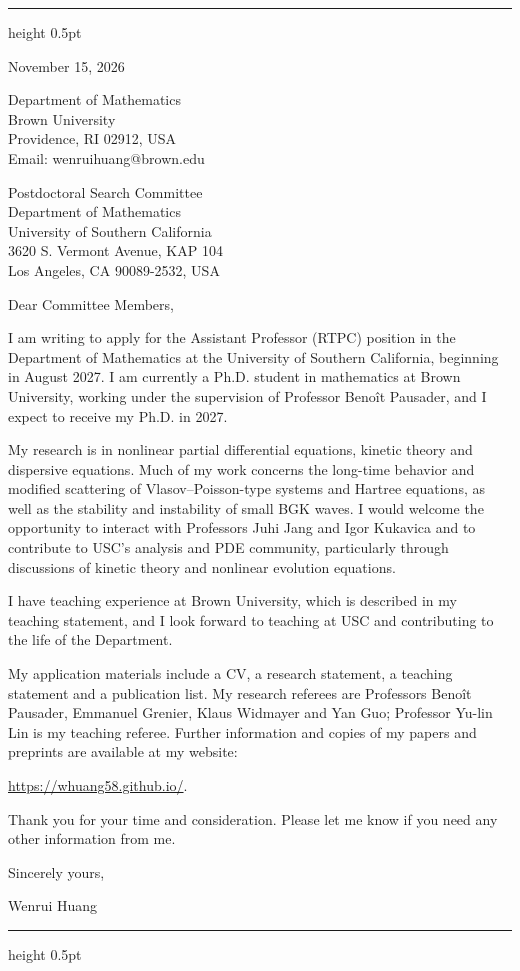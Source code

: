 \documentclass[10pt]{article}
\begin{document}
\vspace{0.08in}
\hrule height 0.5pt

\vspace{0.47in}
\hfill
\begin{minipage}{2.27in}
November 15, 2026

\vspace{0.16in}
Department of Mathematics\\
Brown University\\
Providence, RI 02912, USA\\
Email: wenrui\textunderscore huang@brown.edu
\end{minipage}

\vspace{0.30in}
Postdoctoral Search Committee\\
Department of Mathematics\\
University of Southern California\\
3620 S. Vermont Avenue, KAP 104\\
Los Angeles, CA 90089-2532, USA

\vspace{0.16in}
Dear Committee Members,

I am writing to apply for the Assistant Professor (RTPC) position in the Department of Mathematics at the University of Southern California, beginning in August 2027. I am currently a Ph.D. student in mathematics at Brown University, working under the supervision of Professor Beno\^{i}t Pausader, and I expect to receive my Ph.D. in 2027.

My research is in nonlinear partial differential equations, kinetic theory and dispersive equations. Much of my work concerns the long-time behavior and modified scattering of Vlasov--Poisson-type systems and Hartree equations, as well as the stability and instability of small BGK waves. I would welcome the opportunity to interact with Professors Juhi Jang and Igor Kukavica and to contribute to USC's analysis and PDE community, particularly through discussions of kinetic theory and nonlinear evolution equations.

I have teaching experience at Brown University, which is described in my teaching statement, and I look forward to teaching at USC and contributing to the life of the Department.

My application materials include a CV, a research statement, a teaching statement and a publication list. My research referees are Professors Beno\^{i}t Pausader, Emmanuel Grenier, Klaus Widmayer and Yan Guo; Professor Yu-lin Lin is my teaching referee. Further information and copies of my papers and preprints are available at my website:

\url{https://whuang58.github.io/}.

\medskip
Thank you for your time and consideration. Please let me know if you need any other information from me.

\vspace{0.12in}
Sincerely yours,

\vspace{0.12in}
Wenrui Huang

\vfill
\hrule height 0.5pt
\end{document}

